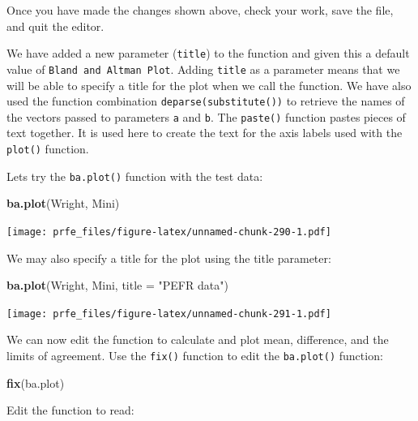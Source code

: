 \documentclass[12pt,a4paper]{book}
\newenvironment{Shaded}{\begin{snugshade}}{\end{snugshade}}
\newcommand{\KeywordTok}[1]{\textcolor[rgb]{0.13,0.29,0.53}{\textbf{#1}}}
\newcommand{\DataTypeTok}[1]{\textcolor[rgb]{0.13,0.29,0.53}{#1}}
\newcommand{\StringTok}[1]{\textcolor[rgb]{0.31,0.60,0.02}{#1}}
\newcommand{\NormalTok}[1]{#1}
\theoremstyle{definition}
\theoremstyle{definition}
\theoremstyle{definition}
\theoremstyle{remark}
\begin{document}
Once you have made the changes shown above, check your work, save the
file, and quit the editor.

We have added a new parameter (\texttt{title}) to the function and given
this a default value of \texttt{Bland\ and\ Altman\ Plot}. Adding
\texttt{title} as a parameter means that we will be able to specify a
title for the plot when we call the function. We have also used the
function combination \texttt{deparse(substitute())} to retrieve the
names of the vectors passed to parameters \texttt{a} and \texttt{b}. The
\texttt{paste()} function pastes pieces of text together. It is used
here to create the text for the axis labels used with the
\texttt{plot()} function.

Lets try the \texttt{ba.plot()} function with the test data:

\begin{Shaded}
\begin{Highlighting}[]
\KeywordTok{ba.plot}\NormalTok{(Wright, Mini)}
\end{Highlighting}
\end{Shaded}

\texttt{[image: prfe\_files/figure-latex/unnamed-chunk-290-1.pdf]}

We may also specify a title for the plot using the title parameter:

\begin{Shaded}
\begin{Highlighting}[]
\KeywordTok{ba.plot}\NormalTok{(Wright, Mini, }\DataTypeTok{title =} \StringTok{"PEFR data"}\NormalTok{)}
\end{Highlighting}
\end{Shaded}

\texttt{[image: prfe\_files/figure-latex/unnamed-chunk-291-1.pdf]}

We can now edit the function to calculate and plot mean, difference, and
the limits of agreement. Use the \texttt{fix()} function to edit the
\texttt{ba.plot()} function:

\begin{Shaded}
\begin{Highlighting}[]
\KeywordTok{fix}\NormalTok{(ba.plot)}
\end{Highlighting}
\end{Shaded}

Edit the function to read:
\end{document}
